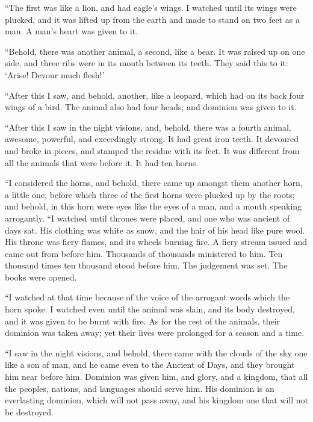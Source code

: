  ``The first was like a lion, and had eagle's wings. I
watched until its wings were plucked, and it was lifted up from the
earth and made to stand on two feet as a man. A man's heart was given to
it.

 ``Behold, there was another animal, a second, like a bear.
It was raised up on one side, and three ribs were in its mouth between
its teeth. They said this to it: `Arise! Devour much flesh!'

 ``After this I saw, and behold, another, like a leopard,
which had on its back four wings of a bird. The animal also had four
heads; and dominion was given to it.

 ``After this I saw in the night visions, and, behold, there
was a fourth animal, awesome, powerful, and exceedingly strong. It had
great iron teeth. It devoured and broke in pieces, and stamped the
residue with its feet. It was different from all the animals that were
before it. It had ten horns.

 ``I considered the horns, and behold, there came up amongst
them another horn, a little one, before which three of the first horns
were plucked up by the roots; and behold, in this horn were eyes like
the eyes of a man, and a mouth speaking arrogantly.  ``I
watched until thrones were placed, and one who was ancient of days sat.
His clothing was white as snow, and the hair of his head like pure wool.
His throne was fiery flames, and its wheels burning fire. 
A fiery stream issued and came out from before him. Thousands of
thousands ministered to him. Ten thousand times ten thousand stood
before him. The judgement was set. The books were opened.

 ``I watched at that time because of the voice of the
arrogant words which the horn spoke. I watched even until the animal was
slain, and its body destroyed, and it was given to be burnt with fire.
 As for the rest of the animals, their dominion was taken
away; yet their lives were prolonged for a season and a time.

 ``I saw in the night visions, and behold, there came with
the clouds of the sky one like a son of man, and he came even to the
Ancient of Days, and they brought him near before him. 
Dominion was given him, and glory, and a kingdom, that all the peoples,
nations, and languages should serve him. His dominion is an everlasting
dominion, which will not pass away, and his kingdom one that will not be
destroyed.

